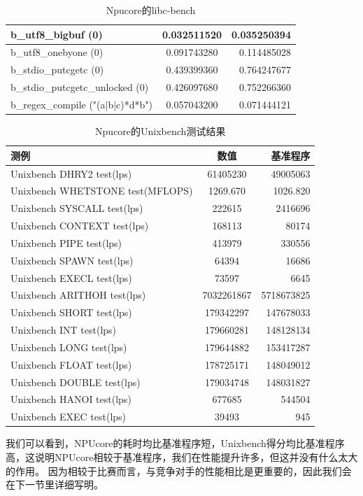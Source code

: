 \begin{table}[H]
\begin{tabular}{|l|c|r|}
        \hline
        b\_utf8\_bigbuf (0) & 0.032511520 &0.035250394\\
        \hline
        b\_utf8\_onebyone (0) & 0.091743280 &0.114485028\\
        \hline
        b\_stdio\_putcgetc (0) & 0.439399360 &0.764247677\\
        \hline
        b\_stdio\_putcgetc\_unlocked (0) & 0.426097680 &0.752266360\\
        \hline
        b\_regex\_compile ("(a|b|c)*d*b") & 0.057043200 &0.071444121\\
        \hline
    \end{tabular}
    \caption{Npucore的libc-bench}
\end{table}

\begin{table}[H]
    \centering
    \begin{tabular}{|l|c|r|}
        \hline
        \textbf{测例} & \textbf{数值} &\textbf{基准程序}\\
        \hline
        Unixbench DHRY2 test(lps) & 61405230 &49005063\\
        \hline
        Unixbench WHETSTONE test(MFLOPS) & 1269.670 &1026.820\\
        \hline
        Unixbench SYSCALL test(lps) & 222615 &2416696\\
        \hline
        Unixbench CONTEXT test(lps) & 168113 &80174\\
        \hline
        Unixbench PIPE test(lps) & 413979 &330556\\
        \hline
        Unixbench SPAWN test(lps) & 64394 &16686\\
        \hline
        Unixbench EXECL test(lps) & 73597 &6645\\
        \hline
        Unixbench ARITHOH test(lps) & 7032261867 &5718673825\\
        \hline
        Unixbench SHORT test(lps) & 179342297 &147678033\\
        \hline
        Unixbench INT test(lps) & 179660281 &148128134\\
        \hline
        Unixbench LONG test(lps) & 179644882 &153417287\\
        \hline
        Unixbench FLOAT test(lps) & 178725171 &148049012\\
        \hline
        Unixbench DOUBLE test(lps) & 179034748 &148031827\\
        \hline
        Unixbench HANOI test(lps) & 677685 &544504\\
        \hline
        Unixbench EXEC test(lps) & 39493 &945\\
        \hline
    \end{tabular}
    \caption{Npucore的Unixbench测试结果}
    \label{Npucore的Unixbench测试结果}
\end{table}
我们可以看到，NPUcore的耗时均比基准程序短，Unixbench得分均比基准程序高，这说明NPUcore相较于基准程序，我们在性能提升许多，但这并没有什么太大的作用。
因为相较于比赛而言，与竞争对手的性能相比是更重要的，因此我们会在下一节里详细写明。

